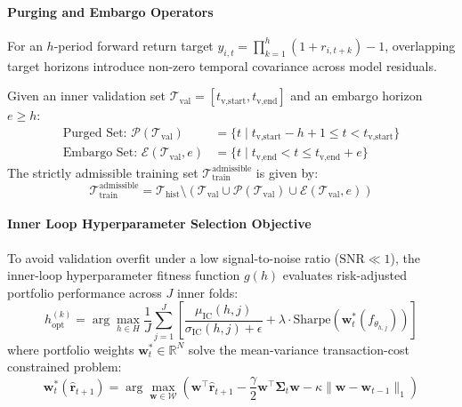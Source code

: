 \paragraph{Purging and Embargo Operators}
For an $h$-period forward return target $y_{i,t} = \displaystyle\prod_{k=1}^h (1 + r_{i,t+k}) - 1$, overlapping target horizons introduce non-zero temporal covariance across model residuals.
\begin{definition}
	Given an inner validation set $\mathcal{T}_{\text{val}} = [t_{\text{v,start}}, t_{\text{v,end}}]$ and an embargo horizon $e \ge h$:
	\begin{align}
		\text{Purged Set: } \mathcal{P}(\mathcal{T}_{\text{val}})     & = \{ t \mid t_{\text{v,start}} - h + 1 \le t < t_{\text{v,start}} \} \\
		\text{Embargo Set: } \mathcal{E}(\mathcal{T}_{\text{val}}, e) & = \{ t \mid t_{\text{v,end}} < t \le t_{\text{v,end}} + e \}
	\end{align}
	The strictly admissible training set $\mathcal{T}_{\text{train}}^{\text{admissible}}$ is given by:
	\begin{equation}
		\mathcal{T}_{\text{train}}^{\text{admissible}} = \mathcal{T}_{\text{hist}} \setminus \left( \mathcal{T}_{\text{val}} \cup \mathcal{P}(\mathcal{T}_{\text{val}}) \cup \mathcal{E}(\mathcal{T}_{\text{val}}, e) \right)
	\end{equation}
\end{definition}

\paragraph{Inner Loop Hyperparameter Selection Objective}
To avoid validation overfit under a low signal-to-noise ratio ($\text{SNR} \ll 1$), the inner-loop hyperparameter fitness function $g(h)$ evaluates risk-adjusted portfolio performance across $J$ inner folds:
\begin{equation}
	h_{\text{opt}}^{(k)} = \arg\max_{h \in H} \dfrac{1}{J} \sum_{j=1}^J \left[ \dfrac{\mu_{\text{IC}}(h, j)}{\sigma_{\text{IC}}(h, j) + \epsilon} + \lambda \cdot \text{Sharpe}\left( \mathbf{w}_t^*(f_{\theta_{h,j}}) \right) \right]
\end{equation}
where portfolio weights $\mathbf{w}_t^* \in \mathbb{R}^N$ solve the mean-variance transaction-cost constrained problem:
\begin{equation}
	\mathbf{w}_t^*(\mathbf{\hat{r}}_{t+1}) = \arg\max_{\mathbf{w} \in \mathcal{W}} \left( \mathbf{w}^\top \mathbf{\hat{r}}_{t+1} - \dfrac{\gamma}{2} \mathbf{w}^\top \boldsymbol{\Sigma}_t \mathbf{w} - \kappa \|\mathbf{w} - \mathbf{w}_{t-1}\|_1 \right)
\end{equation}

